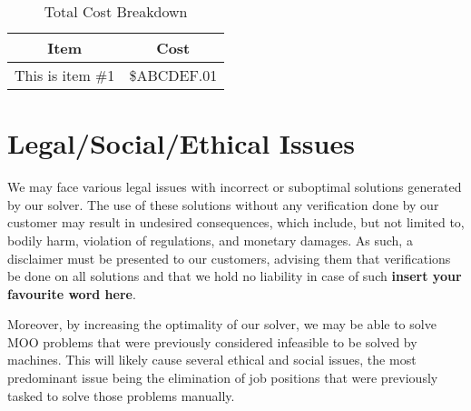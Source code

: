 \documentclass[11pt]{article}
\begin{document}
\begin{table}
  \captionsetup{margin=30pt}
  \caption{Total Cost Breakdown}
  \label{tbl:costbreakdown}
  \centering
  \begin{tabular}{|r|l|}
    \hline
    \multicolumn{1}{|c|}{\textbf{Item}} &
    \multicolumn{1}{|c|}{\textbf{Cost}} \\
    \hline
      This is item \#1 & \$ABCDEF.01 \\
    \hline
  \end{tabular}
\end{table}


\section{Legal/Social/Ethical Issues}
We may face various legal issues with incorrect or suboptimal solutions
generated by our solver. The use of these solutions without any
verification done by our customer may result in undesired
consequences, which include, but not limited to, bodily harm, violation
of regulations, and monetary damages. As such, a disclaimer must be
presented to our customers, advising them that verifications be done
on all solutions and that we hold no liability in case of such
\textbf{\lbrack insert your favourite word here\rbrack}.

Moreover, by increasing the optimality of our solver, we may be able to solve MOO
problems that were previously considered infeasible to be solved by
machines. This will likely cause several ethical and social issues,
the most predominant issue being the elimination of job positions that
were previously tasked to solve those problems manually.
\printbibliography[heading=bibintoc]
\end{document}
